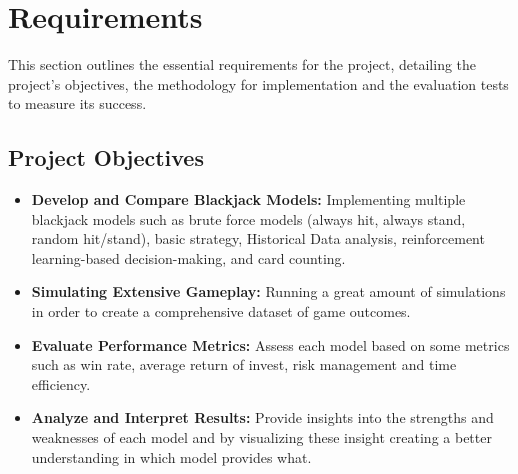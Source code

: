 \documentclass[a4paper,12pt]{report}
\begin{document}
\section{Requirements} This section outlines the essential requirements for the project, detailing the project's objectives, the methodology for implementation and the evaluation tests to measure its success.

\subsection{Project Objectives}
\begin{itemize}
\item \textbf{Develop and Compare Blackjack Models:} Implementing multiple blackjack models such as brute force models (always hit, always stand, random hit/stand), basic strategy, Historical Data analysis, reinforcement learning-based decision-making, and card counting.
\vspace\baselineskip
\item \textbf{Simulating Extensive Gameplay:} Running a great amount of simulations in order to create a comprehensive dataset of game outcomes.
\vspace\baselineskip
\item \textbf{Evaluate Performance Metrics:} Assess each model based on some metrics such as win rate, average return of invest, risk management and time efficiency.
\vspace\baselineskip
\item \textbf{Analyze and Interpret Results:} Provide insights into the strengths and weaknesses of each model and by visualizing these insight creating a better understanding in which model provides what.
\end{itemize}
\vspace\baselineskip
\end{document}
